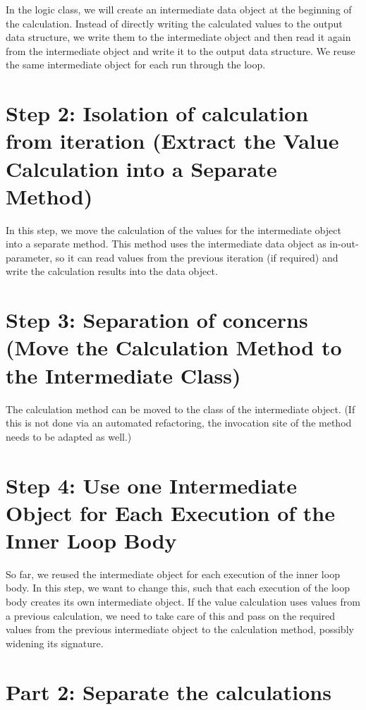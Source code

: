 \documentclass[a4paper,fleqn,titlepage,11pt]{article}
\begin{document}
In the logic class, we will create an intermediate data object at the beginning of the calculation. Instead of directly writing the calculated values to the output data structure, we write them to the intermediate object and then read it again from the intermediate object and write it to the output data structure. We reuse the same intermediate object for each run through the loop.

\section{Step 2: Isolation of calculation from iteration (Extract the Value Calculation into a Separate Method)}

In this step, we move the calculation of the values for the intermediate object into a separate method. This method uses the intermediate data object as in-out-parameter, so it can read values from the previous iteration (if required) and write the calculation results into the data object.

\section{Step 3: Separation of concerns (Move the Calculation Method to the Intermediate Class)}

The calculation method can be moved to the class of the intermediate object. (If this is not done via an automated refactoring, the invocation site of the method needs to be adapted as well.)

\section{Step 4: Use one Intermediate Object for Each Execution of the Inner Loop Body}

So far, we reused the intermediate object for each execution of the inner loop body. In this step, we want to change this, such that each execution of the loop body creates its own intermediate object. If the value calculation uses values from a previous calculation, we need to take care of this and pass on the required values from the previous intermediate object to the calculation method, possibly widening its signature.

\section{Part 2: Separate the calculations}
\end{document}
